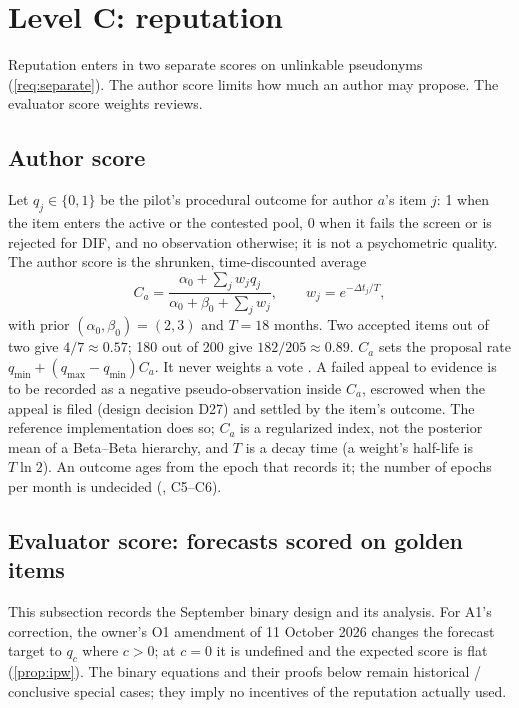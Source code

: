 \section{Level C: reputation}\label{sec:levelc}

Reputation enters in two separate scores on unlinkable pseudonyms (\cref{req:separate}). The
author score limits how much an author may propose. The evaluator score weights reviews.

\subsection{Author score}

Let $q_j\in\{0,1\}$ be the pilot's procedural outcome for author $a$'s item $j$: 1 when the item
enters the active or the contested pool, 0 when it fails the screen or is rejected for DIF, and no
observation otherwise; it is not a psychometric quality. The author score is the shrunken,
time-discounted average
\begin{equation}\label{eq:author}
  C_a=\frac{\alpha_0+\sum_j w_jq_j}{\alpha_0+\beta_0+\sum_j w_j},\qquad w_j=e^{-\Delta t_j/T},
\end{equation}
with prior $(\alpha_0,\beta_0)=(2,3)$ and $T=18$ months. Two accepted items out of two give
$4/7\approx0.57$; 180 out of 200 give $182/205\approx0.89$. $C_a$ sets the proposal rate
$q_{\min}+(q_{\max}-q_{\min})C_a$. It never weights a vote \designchoice. A failed appeal to
evidence is to be recorded as a negative pseudo-observation inside $C_a$, escrowed when the appeal
is filed (design decision D27) and settled by the item's outcome. The reference implementation
does so; $C_a$ is a regularized index, not the posterior mean of a Beta--Beta hierarchy, and $T$
is a decay time (a weight's half-life is $T\ln 2$). An outcome ages from the epoch that records
it; the number of epochs per month is undecided (, C5--C6).

\subsection{Evaluator score: forecasts scored on golden items}

This subsection records the September binary design and its analysis. For A1's correction,
the owner's O1 amendment of 11 October 2026 changes the forecast target to $q_c$ where $c>0$;
at $c=0$ it is undefined and the expected score is flat (\cref{prop:ipw}).
The binary equations and their proofs below remain historical / conclusive special cases;
they imply no incentives of the reputation actually used.

